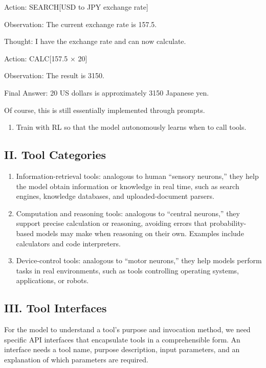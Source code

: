 Action: SEARCH{[}USD to JPY exchange rate{]}

Observation: The current exchange rate is 157.5.

Thought: I have the exchange rate and can now calculate.

Action: CALC{[}157.5 × 20{]}

Observation: The result is 3150.

Final Answer: 20 US dollars is approximately 3150 Japanese yen.

Of course, this is still essentially implemented through prompts.

\begin{enumerate}
\def\labelenumi{(\arabic{enumi})}
\setcounter{enumi}{2}
\tightlist
\item
  Train with RL so that the model autonomously learns when to call tools.
\end{enumerate}

\hypertarget{ii.-tool-categories}{%
\subsection{II. Tool Categories}\label{ii.-tool-categories}}

\begin{enumerate}
\def\labelenumi{\arabic{enumi}.}
\item
  Information-retrieval tools: analogous to human ``sensory neurons,'' they help the model obtain information or knowledge in real time, such as search engines, knowledge databases, and uploaded-document parsers.
\item
  Computation and reasoning tools: analogous to ``central neurons,'' they support precise calculation or reasoning, avoiding errors that probability-based models may make when reasoning on their own. Examples include calculators and code interpreters.
\item
  Device-control tools: analogous to ``motor neurons,'' they help models perform tasks in real environments, such as tools controlling operating systems, applications, or robots.
\end{enumerate}

\hypertarget{iii.-tool-interfaces}{%
\subsection{III. Tool Interfaces}\label{iii.-tool-interfaces}}

For the model to understand a tool's purpose and invocation method, we need specific API interfaces that encapsulate tools in a comprehensible form. An interface needs a tool name, purpose description, input parameters, and an explanation of which parameters are required.

